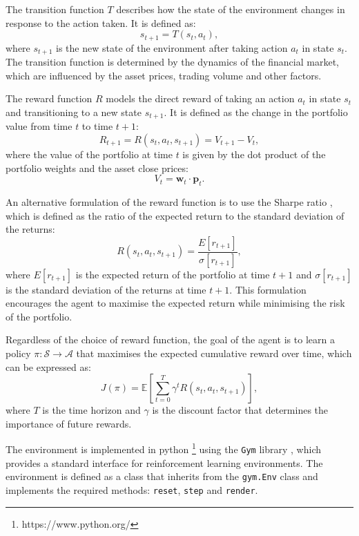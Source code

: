 The transition function $T$ describes how the state of the environment changes in response to the action taken. It is defined as:
\begin{equation}
    s_{t+1} = T(s_t, a_t),
\end{equation}
where $s_{t+1}$ is the new state of the environment after taking action $a_t$ in state $s_t$. The transition function is determined by the dynamics of the financial market, which are influenced by the asset prices, trading volume and other factors.

The reward function $R$ models the direct reward of taking an action $a_t$ in state $s_t$ and transitioning to a new state $s_{t+1}$. It is defined as the change in the portfolio value from time $t$ to time $t+1$:
\begin{equation}
    R_{t+1} = R(s_t, a_t, s_{t+1}) = V_{t+1} - V_t,
\end{equation}
where the value of the portfolio at time $t$ is given by the dot product of the portfolio weights and the asset close prices:
\begin{equation}
    V_t = \mathbf{w}_t \cdot \mathbf{p}_t.
\end{equation}

An alternative formulation of the reward function is to use the Sharpe ratio \cite{Sharpe1994}, which is defined as the ratio of the expected return to the standard deviation of the returns:
\begin{equation}
    R(s_t, a_t, s_{t+1}) = \frac{E[r_{t+1}]}{\sigma[r_{t+1}]},
\end{equation}
where $E[r_{t+1}]$ is the expected return of the portfolio at time $t+1$ and $\sigma[r_{t+1}]$ is the standard deviation of the returns at time $t+1$. This formulation encourages the agent to maximise the expected return while minimising the risk of the portfolio.

Regardless of the choice of reward function, the goal of the agent is to learn a policy $\pi: \mathcal{S} \to \mathcal{A}$ that maximises the expected cumulative reward over time, which can be expressed as:
\begin{equation}
    J(\pi) = \mathbb{E} \left[\sum_{t=0}^{T} \gamma^t R(s_t, a_t, s_{t+1}) \right],
\end{equation} 
where $T$ is the time horizon and $\gamma$ is the discount factor that determines the importance of future rewards. 

The environment is implemented in \Gls{python} \footnote{https://www.python.org/} using the \texttt{Gym} library \cite{Brockman2016}, which provides a standard interface for reinforcement learning environments. The environment is defined as a class that inherits from the \texttt{gym.Env} class and implements the required methods: \texttt{reset}, \texttt{step} and \texttt{render}.

